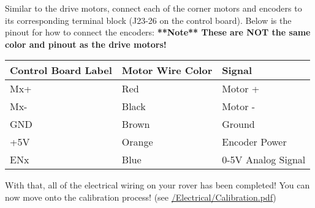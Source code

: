 \documentclass{article}
\begin{document}
\bigskip

Similar to the drive motors, connect each of the corner motors and encoders to its corresponding terminal block (J23-26 on the control board). Below is the pinout for how to connect the encoders: \textbf{**Note** These are NOT the same color and pinout as the drive motors!}

\bigskip

\begin{tabular}[3] {| l | l | l |}
	\hline
	\textbf{Control Board Label} & \textbf{Motor Wire Color} & \textbf{Signal} \\ \hline
	Mx+ & Red & Motor + \\ \hline
	Mx- & Black & Motor - \\ \hline
	GND & Brown & Ground \\ \hline
	+5V & Orange & Encoder Power \\ \hline
	ENx & Blue & 0-5V Analog Signal \\ \hline
	\hline
\end{tabular} 

\bigskip 
With that, all of the electrical wiring on your rover has been completed! You can now move onto the calibration process!  (see \href{https://github.com/nasa-jpl/open-source-rover/blob/master/Electrical/Calibration.pdf}{/Electrical/Calibration.pdf})
\end{document}
